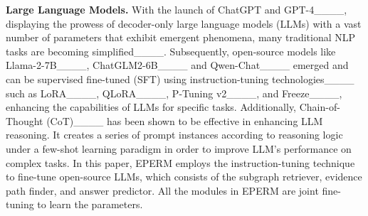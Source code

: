 \noindent \textbf{Large Language Models.} 
With the launch of ChatGPT and GPT-4____, displaying the prowess of decoder-only large language models (LLMs) with a vast number of parameters that exhibit emergent phenomena, many traditional NLP tasks are becoming simplified____. Subsequently, open-source models like Llama-2-7B____, ChatGLM2-6B____ and Qwen-Chat____ emerged and can be supervised fine-tuned (SFT) using instruction-tuning technologies____ such as LoRA____, QLoRA____, P-Tuning v2____, and Freeze____, enhancing the capabilities of LLMs for specific tasks. Additionally, Chain-of-Thought (CoT)____ has been shown to be effective in enhancing LLM reasoning. It creates a series of prompt instances according to reasoning logic under a few-shot learning paradigm in order to improve LLM’s performance on complex tasks. In this paper, EPERM employs the instruction-tuning technique to fine-tune open-source LLMs, which consists of the subgraph retriever, evidence path finder, and answer predictor. All the modules in EPERM are joint fine-tuning to learn the parameters.